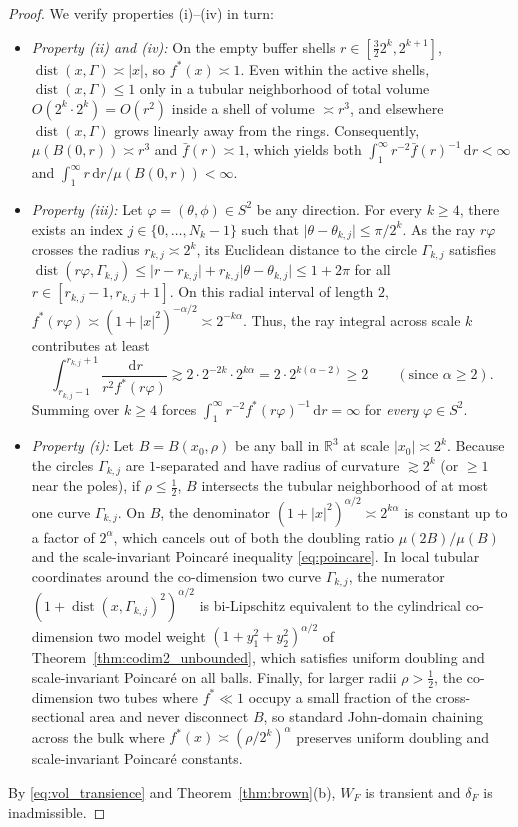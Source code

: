 \documentclass[a4paper,11pt,noarxiv]{quantumarticle}
\newcommand{\R}{\mathbb{R}}
\newcommand{\abs}[1]{\lvert #1\rvert}
\newcommand{\dd}{\,\mathrm{d}}
\newcommand{\fbar}{\bar f}
\DeclareMathOperator{\dist}{dist}
\theoremstyle{plain}
\theoremstyle{definition}
\theoremstyle{remark}
\begin{document}
\begin{proof}
We verify properties (i)--(iv) in turn:
\begin{itemize}[leftmargin=1.5em,itemsep=2pt]
\item \emph{Property (ii) and (iv):} On the empty buffer shells
$r\in[\tfrac32 2^k,2^{k+1}]$, $\dist(x,\Gamma)\asymp\abs{x}$, so
$f^*(x)\asymp1$. Even within the active shells, $\dist(x,\Gamma)\le1$
only in a tubular neighborhood of total volume $O(2^k\cdot 2^k)=O(r^2)$
inside a shell of volume $\asymp r^3$, and elsewhere $\dist(x,\Gamma)$
grows linearly away from the rings. Consequently, $\mu(B(0,r))\asymp r^3$
and $\fbar(r)\asymp1$, which yields both
$\int_1^\infty r^{-2}\fbar(r)^{-1}\dd r<\infty$ and
$\int_1^\infty r\dd r/\mu(B(0,r))<\infty$.
\item \emph{Property (iii):} Let $\varphi=(\theta,\phi)\in S^2$ be any
direction. For every $k\ge4$, there exists an index $j\in\{0,\dots,N_k-1\}$
such that $\abs{\theta-\theta_{k,j}}\le\pi/2^k$. As the ray $r\varphi$
crosses the radius $r_{k,j}\asymp 2^k$, its Euclidean distance to the
circle $\Gamma_{k,j}$ satisfies $\dist(r\varphi,\Gamma_{k,j})\le\abs{r-r_{k,j}}
+r_{k,j}\abs{\theta-\theta_{k,j}}\le 1+2\pi$ for all
$r\in[r_{k,j}-1,r_{k,j}+1]$. On this radial interval of length $2$,
$f^*(r\varphi)\asymp(1+\abs{x}^2)^{-\alpha/2}\asymp 2^{-k\alpha}$. Thus,
the ray integral across scale $k$ contributes at least
\[
\int_{r_{k,j}-1}^{r_{k,j}+1}\frac{\dd r}{r^2 f^*(r\varphi)}
\gtrsim 2\cdot 2^{-2k}\cdot 2^{k\alpha}=2\cdot 2^{k(\alpha-2)}\ge 2
\qquad(\text{since }\alpha\ge2).
\]
Summing over $k\ge4$ forces $\int_1^\infty r^{-2}f^*(r\varphi)^{-1}\dd r=\infty$
for \emph{every} $\varphi\in S^2$.
\item \emph{Property (i):} Let $B=B(x_0,\rho)$ be any ball in $\R^3$ at
scale $\abs{x_0}\asymp 2^k$. Because the circles $\Gamma_{k,j}$ are
$1$-separated and have radius of curvature $\gtrsim 2^k$ (or $\ge1$ near
the poles), if $\rho\le\tfrac12$, $B$ intersects the tubular
neighborhood of at most one curve $\Gamma_{k,j}$. On $B$, the denominator
$(1+\abs{x}^2)^{\alpha/2}\asymp 2^{k\alpha}$ is constant up to a factor
of $2^\alpha$, which cancels out of both the doubling ratio
$\mu(2B)/\mu(B)$ and the scale-invariant Poincar\'e inequality
\eqref{eq:poincare}. In local tubular coordinates around the
co-dimension two curve $\Gamma_{k,j}$, the numerator
$(1+\dist(x,\Gamma_{k,j})^2)^{\alpha/2}$ is bi-Lipschitz equivalent to
the cylindrical co-dimension two model weight $(1+y_1^2+y_2^2)^{\alpha/2}$
of Theorem~\ref{thm:codim2_unbounded}, which satisfies uniform doubling
and scale-invariant Poincar\'e on all balls. Finally, for larger radii
$\rho>\tfrac12$, the co-dimension two tubes where $f^*\ll1$ occupy a
small fraction of the cross-sectional area and never disconnect $B$, so
standard John-domain chaining across the bulk where
$f^*(x)\asymp(\rho/2^k)^\alpha$ preserves uniform doubling and
scale-invariant Poincar\'e constants.
\end{itemize}
By \eqref{eq:vol_transience} and Theorem~\ref{thm:brown}(b), $W_F$ is
transient and $\delta_F$ is inadmissible.
\end{proof}
\end{document}
